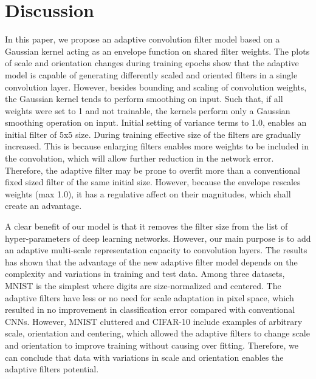 \documentclass{bmvc2k}
\begin{document}
\section{Discussion}

In this paper, we propose an adaptive convolution filter model based on a Gaussian kernel acting as an envelope function on shared filter weights. The plots of scale and orientation changes during training epochs show that the adaptive model is capable of generating differently scaled and oriented filters in a single convolution layer. However, besides bounding and scaling of convolution weights, the Gaussian kernel tends to perform smoothing on input. Such that, if all weights were set to 1 and not trainable, the kernels perform only a Gaussian smoothing operation on input. Initial setting of variance terms to 1.0, enables an initial filter of 5x5 size. During training effective size of the filters are gradually increased. This is because enlarging filters enables more weights to be included in the convolution, which will allow further reduction in the network error. Therefore, the adaptive filter may be prone to overfit more than a conventional fixed sized filter of the same initial size. However, because the envelope rescales weights (max 1.0), it has a regulative affect on their magnitudes, which shall create an advantage. 

A clear benefit of our model is that it removes the filter size from the list of hyper-parameters of deep learning networks. However, our main purpose is to add an adaptive multi-scale representation capacity to convolution layers. The results has shown that the advantage of the new adaptive filter model depends on the complexity and variations in training and test data. Among three datasets, MNIST is the simplest where digits are size-normalized and centered. The adaptive filters have less or no need for scale adaptation in pixel space, which resulted in no improvement in classification error compared with conventional CNNs.
However, MNIST cluttered and CIFAR-10 include examples of arbitrary scale, orientation and centering, which allowed the adaptive filters to change scale and orientation to improve training
without causing over fitting. Therefore, we can conclude that data with variations in scale and orientation enables the adaptive filters potential.

\end{document}
